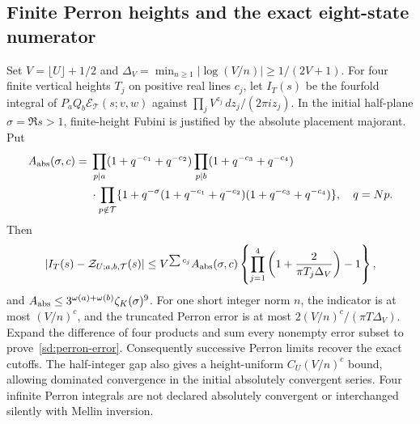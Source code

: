 \subsection{Finite Perron heights and the exact eight-state numerator}
Set $V=\lfloor U\rfloor+1/2$ and
$\Delta_V=\min_{n\ge1}|\log(V/n)|\ge1/(2V+1)$.
For four finite vertical heights $T_j$ on positive real lines $c_j$,
let $I_T(s)$ be the fourfold integral of
$P_aQ_b\mathcal E_{\mathcal T}(s;v,w)$ against
$\prod_j V^{z_j}\,dz_j/(2\pi i z_j)$.
In the initial half-plane $\sigma=\Re s>1$, finite-height Fubini is
justified by the absolute placement majorant. Put
\[
 \begin{split}
 A_{\rm abs}(\sigma,c)={}&
 \prod_{p\mid a}(1+q^{-c_1}+q^{-c_2})
 \prod_{p\mid b}(1+q^{-c_3}+q^{-c_4})\\
 &{}\cdot\prod_{p\notin\mathcal T}
 \{1+q^{-\sigma}(1+q^{-c_1}+q^{-c_2})
                     (1+q^{-c_3}+q^{-c_4})\},\quad q=Np.
 \end{split}
\]
Then
\begin{equation}\label{sd:perron-error}
 |I_T(s)-\mathcal Z_{U;a,b,\mathcal T}(s)|
 \le V^{\sum c_j}A_{\rm abs}(\sigma,c)
 \left\{\prod_{j=1}^4
    \left(1+\frac{2}{\pi T_j\Delta_V}\right)-1\right\},
\end{equation}
and $A_{\rm abs}\le3^{\omega(a)+\omega(b)}\zeta_K(\sigma)^9$.
For one short integer norm $n$, the indicator is at most $(V/n)^c$,
and the truncated Perron error is at most
$2(V/n)^c/(\pi T\Delta_V)$. Expand the difference of four products and
sum every nonempty error subset to prove~\eqref{sd:perron-error}.
Consequently successive Perron limits recover the exact cutoffs.
The half-integer gap also gives a height-uniform $C_U(V/n)^c$ bound,
allowing dominated convergence in the initial absolutely convergent
series. Four infinite Perron integrals are not declared absolutely
convergent or interchanged silently with Mellin inversion.

